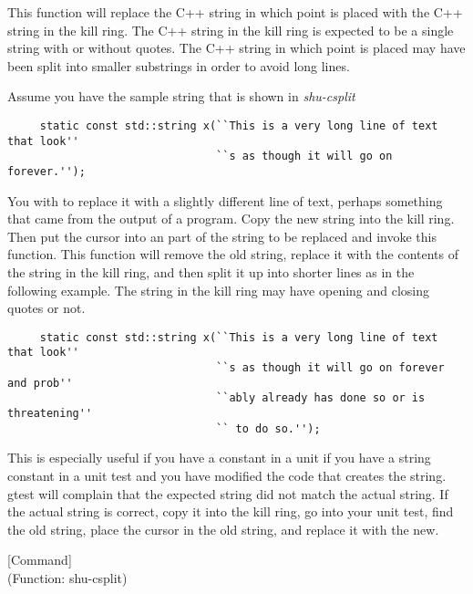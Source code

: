 \begin{doc-string}
This function will replace the C++ string in which point is placed with the
C++ string in the kill ring.  The C++ string in the kill ring is expected to be
a single string with or without quotes.  The C++ string in which point is placed
may have been split into smaller substrings in order to avoid long lines.

Assume you have the sample string that is shown in \emph{shu-csplit}

\small{\begin{verbatim}
     static const std::string x(``This is a very long line of text that look''
                                ``s as though it will go on forever.'');
\end{verbatim}}

You with to replace it with a slightly different line of text, perhaps something
that came from the output of a program.  Copy the new string into the kill ring.
Then put the cursor into an part of the string to be replaced and invoke this
function.  This function will remove the old string, replace it with the
contents of the string in the kill ring, and then split it up into shorter lines
as in the following example.  The string in the kill ring may have opening and
closing quotes or not.

\small{\begin{verbatim}
     static const std::string x(``This is a very long line of text that look''
                                ``s as though it will go on forever and prob''
                                ``ably already has done so or is threatening''
                                `` to do so.'');
\end{verbatim}}

This is especially useful if you have a constant in a unit if you have a string
constant in a unit test and you have modified the code that creates the string.
gtest will complain that the expected string did not match the actual string.
If the actual string is correct, copy it into the kill ring, go into your unit
test, find the old string, place the cursor in the old string, and replace it
with the new.
\end{doc-string}

\vspace{1em}
\noindent
{}
\usebox{\funcname}
 \hfill [Command]\\%
 (Function: shu-csplit)


